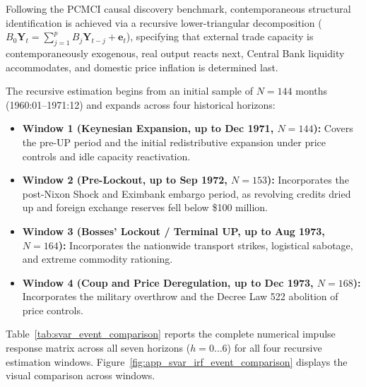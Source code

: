 Following the PCMCI causal discovery benchmark, contemporaneous structural identification is achieved via a recursive lower-triangular decomposition ($B_0 \mathbf{Y}_t = \sum_{j=1}^p B_j \mathbf{Y}_{t-j} + \mathbf{e}_t$), specifying that external trade capacity is contemporaneously exogenous, real output reacts next, Central Bank liquidity accommodates, and domestic price inflation is determined last.

The recursive estimation begins from an initial sample of $N=144$ months (1960:01--1971:12) and expands across four historical horizons:
\begin{itemize}[leftmargin=2em]
	\item \textbf{Window 1 (Keynesian Expansion, up to Dec 1971, $N=144$):} Covers the pre-UP period and the initial redistributive expansion under price controls and idle capacity reactivation.
	\item \textbf{Window 2 (Pre-Lockout, up to Sep 1972, $N=153$):} Incorporates the post-Nixon Shock and Eximbank embargo period, as revolving credits dried up and foreign exchange reserves fell below \$100 million.
	\item \textbf{Window 3 (Bosses' Lockout / Terminal UP, up to Aug 1973, $N=164$):} Incorporates the nationwide transport strikes, logistical sabotage, and extreme commodity rationing.
	\item \textbf{Window 4 (Coup and Price Deregulation, up to Dec 1973, $N=168$):} Incorporates the military overthrow and the Decree Law 522 abolition of price controls.
\end{itemize}

Table~\ref{tab:svar_event_comparison} reports the complete numerical impulse response matrix across all seven horizons ($h=0 \dots 6$) for all four recursive estimation windows. Figure~\ref{fig:app_svar_irf_event_comparison} displays the visual comparison across windows.



